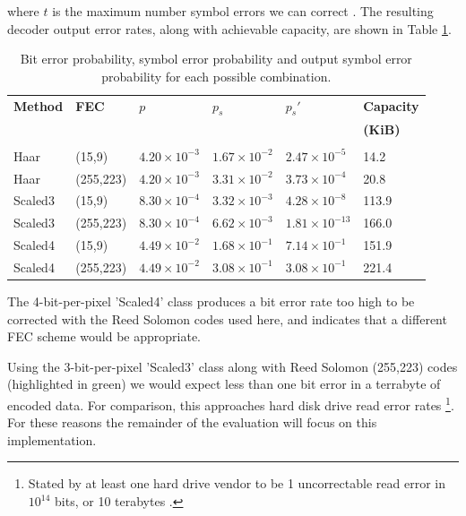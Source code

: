 where $t$ is the maximum number symbol errors we can correct \cite{rsfec-decode}. The resulting decoder output error rates, along with achievable capacity, are shown in Table \ref{tab:fec}.

\begin{table}[tbph]
  \begin{center}
        \begin{tabular}{l l l l l l}
            
            \textbf{Method} & \textbf{FEC} & \textbf{$p$} & \textbf{$p_s$} & \textbf{$p_s'$} & \textbf{Capacity} \\  & &  &  &  & \textbf{(KiB)} \\[0.1ex] \hline \\ [-1.5ex]

            Haar & (15,9) & $4.20 \times 10^{-3}$ & $1.67 \times 10^{-2}$ & $2.47 \times 10^{-5}$ & 14.2 \\
            Haar &  (255,223) & $4.20 \times 10^{-3}$ & $3.31 \times 10^{-2}$ & $3.73 \times 10^{-4}$ & 20.8 \\
            Scaled3 & (15,9) & $8.30 \times 10^{-4}$ & $3.32 \times 10^{-3}$ & $4.28 \times 10^{-8}
$ & 113.9 \\
            \rowcolor{green!20!white} Scaled3 & (255,223) & $8.30 \times 10^{-4}$ & $6.62 \times 10^{-3}$ & $1.81 \times 10^{-13}
$ & 166.0 \\
            Scaled4 & (15,9) & $4.49 \times 10^{-2}$ & $1.68 \times 10^{-1}$ & $7.14 \times 10^{-1}$ & 151.9 \\
            Scaled4 & (255,223) & $4.49 \times 10^{-2}$ & $3.08 \times 10^{-1}$ & $3.08
 \times 10^{-1}$ & 221.4 \\
            
        \end{tabular}
        \caption{Bit error probability, symbol error probability and output symbol error probability for each possible combination.}
        \label{tab:fec}
    \end{center}
\end{table}

The 4-bit-per-pixel 'Scaled4' class produces a bit error rate too high to be corrected with the Reed Solomon codes used here, and indicates that a different FEC scheme would be appropriate.

Using the 3-bit-per-pixel 'Scaled3' class along with Reed Solomon (255,223) codes (highlighted in green) we would expect less than one bit error in a terrabyte of encoded data. For comparison, this approaches hard disk drive read error rates \footnote{Stated by at least one hard drive vendor to be 1 uncorrectable read error in $10^{14}$ bits, or 10 terabytes \cite{hdd-errors}.}. For these reasons the remainder of the evaluation will focus on this implementation.














